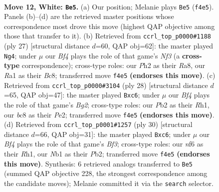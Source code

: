 \documentclass[11pt]{article}
\begin{document}
\clearpage

\begin{figure}[p]\centering
\begin{subfigure}{0.46\textwidth}\centering
\resizebox{\linewidth}{!}{%
\newchessgame
\chessboard[
  setfen={rnb2rk1/pp3p2/4pnp1/2b4p/2N2B2/6P1/PP2PPBP/RN1R2K1 w - - 0 12},
  showmover=false,
  pgfstyle=straightmove, color=movearrow, markmove={f4-e5}
]}
\caption{}
\end{subfigure}\hfill
\begin{subfigure}{0.46\textwidth}\centering
\resizebox{\linewidth}{!}{%
\newchessgame
\chessboard[
  setfen={r1br2k1/2p2ppp/p4n2/2b1p3/Pp2P3/1B3N2/1PP2PPP/R1B1R1K1 b - - 3 14},
  showmover=false,
  pgfstyle=straightmove, color=movearrow, markmove={f6-g4}
]}
\caption{}
\end{subfigure}
\\[4pt]
\begin{subfigure}{0.46\textwidth}\centering
\resizebox{\linewidth}{!}{%
\newchessgame
\chessboard[
  setfen={r1b1r2k/ppp3bp/2n3p1/4ppN1/2P5/1PB3P1/P3PPBP/2R1K2R w K - 2 15},
  showmover=false,
  pgfstyle=straightmove, color=movearrow, markmove={g2-c6}
]}
\caption{}
\end{subfigure}\hfill
\begin{subfigure}{0.46\textwidth}\centering
\resizebox{\linewidth}{!}{%
\newchessgame
\chessboard[
  setfen={r4rk1/1p3ppp/p1b1pn2/2b5/5B2/2NR1B2/PPP2PPP/2K4R w - - 2 16},
  showmover=false,
  pgfstyle=straightmove, color=movearrow, markmove={f3-c6}
]}
\caption{}
\end{subfigure}
\caption{\textbf{Move 12, White: \texttt{Be5}.} (a) Our position; Melanie plays \texttt{Be5} (\texttt{f4e5}). Panels (b)--(d) are the retrieved master positions whose correspondence most drove this move (highest QAP objective among those that transfer to it). (b) Retrieved from \texttt{ccrl\_top\_p0000\#1188} (ply 27) [structural distance $d$=60, QAP obj=62]: the master played \texttt{Ng4}; under $\mu$ our \emph{Bf4} plays the role of that game's \emph{Nf3} (a \textbf{cross-type} correspondence); cross-type roles: our \emph{P}h2 as their \emph{R}a8, our \emph{R}a1 as their \emph{B}c8; transferred move \texttt{f4e5} \textbf{(endorses this move)}. (c) Retrieved from \texttt{ccrl\_top\_p0000\#3104} (ply 28) [structural distance $d$=65, QAP obj=47]: the master played \texttt{Bxc6}; under $\mu$ our \emph{Bf4} plays the role of that game's \emph{Bg2}; cross-type roles: our \emph{P}b2 as their \emph{R}h1, our \emph{b}c8 as their \emph{P}e2; transferred move \texttt{f4e5} \textbf{(endorses this move)}. (d) Retrieved from \texttt{ccrl\_top\_p0001\#1257} (ply 30) [structural distance $d$=66, QAP obj=31]: the master played \texttt{Bxc6}; under $\mu$ our \emph{Bf4} plays the role of that game's \emph{Bf3}; cross-type roles: our \emph{n}f6 as their \emph{R}h1, our \emph{N}b1 as their \emph{P}b2; transferred move \texttt{f4e5} \textbf{(endorses this move)}. Synthesis: 6 retrieved analogs transferred to \texttt{Be5} (summed QAP objective 228, the strongest correspondence among the candidate moves); Melanie committed it via the \texttt{search} selector.}
\label{fig:thought-m22}
\end{figure}
\end{document}
